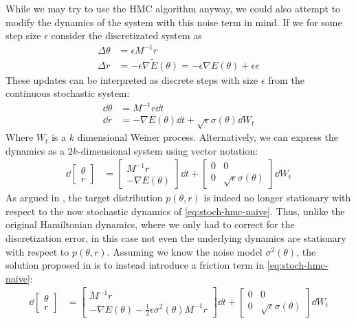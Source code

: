 While we may try to use the HMC algorithm anyway, we could also attempt to modify the dynamics of the system with this noise term in mind.
If we for some step size $\epsilon$ consider the discretizated system as
\begin{align}
    \Delta \theta &=  \epsilon M^{-1} r\\
    \Delta r &=  -\epsilon\nabla{\tilde{E}}(\theta) = -\epsilon\nabla{E}(\theta)  + \epsilon e
\end{align}
These updates can be interpreted as discrete steps with size $\epsilon$ from the continuous stochastic system:
\begin{align*}
    \dd{\theta} &= M^{-1} r\dd{t} \\
    \dd{r} &= -\nabla{E}(\theta)\dd{t}  + \sqrt{\epsilon}\sigma(\theta) \dd{W_t} 
\end{align*}
Where $W_t$ is a $k$ dimensional Weiner process. Alternatively, we can express the dynamics as a $2k$-dimensional system using vector notation:
\begin{align} \label{eq:stoch-hmc-naive}
    \dd{\begin{bmatrix}\theta \\ r \end{bmatrix}} &= 
    \begin{bmatrix}
        M^{-1}r \\ -\nabla{E}(\theta) 
    \end{bmatrix} \dd{t} + \begin{bmatrix}
        0 & 0 \\ 
        0 & \sqrt{\epsilon}\sigma(\theta)
    \end{bmatrix} \dd{W_t}
\end{align}
As argued in \cite{chen_stochastic_2014}, the target distribution $p(\theta, r)$ is indeed no longer stationary with respect to the now stochastic dynamics of \cref{eq:stoch-hmc-naive}. Thus, unlike the original Hamiltonian dynamics, where we only had to correct for the discretization error, in this case not even the underlying dynamics are stationary with respect to $p(\theta, r)$. Assuming we know the noise model $\sigma^2(\theta)$, the solution proposed in \cite{chen_stochastic_2014} is to instead introduce a friction term in \cref{eq:stoch-hmc-naive}:
\begin{align} \label{eq:stoch-hmc-w-friction}
    \dd{\begin{bmatrix}\theta \\ r \end{bmatrix}} &= 
    \begin{bmatrix}
        M^{-1}r \\ -\nabla{E}(\theta)-\frac{1}{2}\epsilon\sigma^2(\theta)M^{-1}r
    \end{bmatrix} \dd{t} + \begin{bmatrix}
        0 & 0 \\ 
        0 & \sqrt{\epsilon}\sigma(\theta)
    \end{bmatrix} \dd{W_t}
\end{align}
